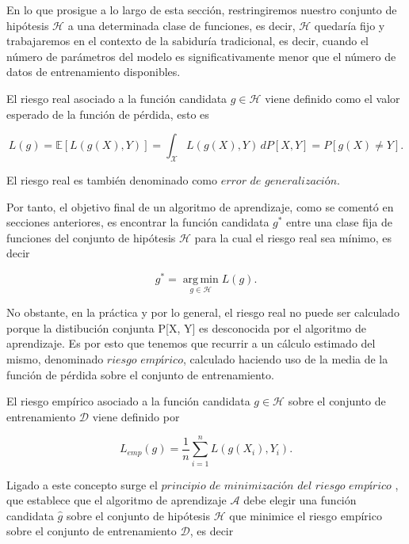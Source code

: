 En lo que prosigue a lo largo de esta sección, restringiremos nuestro conjunto de hipótesis $\mathcal{H}$ a una determinada clase de funciones, es decir, $\mathcal{H}$ quedaría fijo y trabajaremos en el contexto de la sabiduría tradicional, es decir, cuando el número de parámetros del modelo es significativamente menor que el número de datos de entrenamiento disponibles.\newline

\begin{definicion}\label{def:riesgo-real}
    El riesgo real asociado a la función candidata $g \in \mathcal{H}$ viene definido como el valor esperado de la función de pérdida, esto es

    \[ L(g) = \mathbb{E}[L(g(X), Y)] = \int_{\mathcal{X}} L(g(X), Y) \, dP[X, Y] = P[g(X) \neq Y].\]

    El riesgo real es también denominado como $\textit{error de generalización}$.\newline
\end{definicion}

Por tanto, el objetivo final de un algoritmo de aprendizaje, como se comentó en secciones anteriores, es encontrar la función candidata $g^{*}$ entre una clase fija de funciones del conjunto de hipótesis $\mathcal{H}$ para la cual el riesgo real sea mínimo, es decir

\[ g^{*} = \operatorname*{\arg \,\min}_{g \in \mathcal{H}} L(g). \]\newline

No obstante, en la práctica y por lo general, el riesgo real no puede ser calculado porque la distibución conjunta P[X, Y] es desconocida por el algoritmo de aprendizaje. Es por esto que tenemos que recurrir a un cálculo estimado del mismo, denominado $\textit{riesgo empírico}$, calculado haciendo uso de la media de la función de pérdida sobre el conjunto de entrenamiento.\newline

\begin{definicion}\label{def:riesgo-empírico}
    El riesgo empírico asociado a la función candidata $g \in \mathcal{H}$ sobre el conjunto de entrenamiento $\mathcal{D}$ viene definido por

    \[ L_{emp}(g) = \frac{1}{n} \sum_{i=1}^{n}L(g(X_{i}), Y_{i}). \]\newline
\end{definicion}

Ligado a este concepto surge el $\textit{principio de minimización del riesgo empírico}$ \cite{Vapnik1991}, que establece que el algoritmo de aprendizaje $\mathcal{A}$ debe elegir una función candidata $\hat{g}$ sobre el conjunto de hipótesis $\mathcal{H}$ que minimice el riesgo empírico sobre el conjunto de entrenamiento $\mathcal{D}$, es decir

